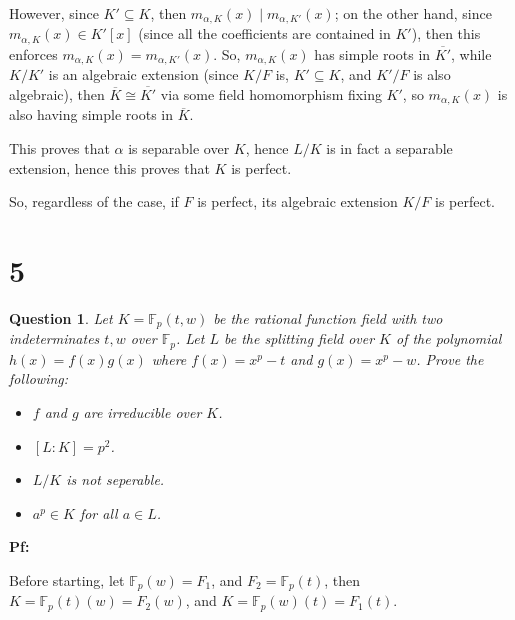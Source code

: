 \documentclass{article}
\newtheorem{question}{Question}
\begin{document}
However, since $K'\subseteq K$, then $m_{\alpha,K}(x)\mid m_{\alpha,K'}(x)$; on the other hand, since $m_{\alpha,K}(x)\in K'[x]$ (since all the coefficients are contained in $K'$), then this enforces $m_{\alpha,K}(x) = m_{\alpha,K'}(x)$. So, $m_{\alpha,K}(x)$ has simple roots in $\overline{K'}$, while $K/K'$ is an algebraic extension (since $K/F$ is, $K'\subseteq K$, and $K'/F$ is also algebraic), then $\overline{K}\cong \overline{K'}$ via some field homomorphism fixing $K'$, so $m_{\alpha,K}(x)$ is also having simple roots in $\overline{K}$.

This proves that $\alpha$ is separable over $K$, hence $L/K$ is in fact a separable extension, hence this proves that $K$ is perfect.

\hfil

So, regardless of the case, if $F$ is perfect, its algebraic extension $K/F$ is perfect.

\break

\section*{5}
\begin{myBox}[]{}
    \begin{question}
        Let $K=\mathbb{F}_p(t,w)$ be the rational function field with two indeterminates $t,w$ over $\mathbb{F}_p$. Let $L$ be the splitting field over $K$ of the polynomial $h(x)=f(x)g(x)$ where $f(x)=x^p-t$ and $g(x)=x^p-w$. Prove the following:
        \begin{itemize}
            \item[(a)] $f$ and $g$ are irreducible over $K$.
            \item[(b)] $[L:K]=p^2$.
            \item[(c)] $L/K$ is not seperable.
            \item[(d)] $a^p\in K$ for all $a\in L$.
        \end{itemize}
    \end{question}
\end{myBox}

\textbf{Pf:}

Before starting, let $\mathbb{F}_p(w) = F_1$, and $F_2 = \mathbb{F}_p(t)$, then $K=\mathbb{F}_p(t)(w) = F_2(w)$, and $K=\mathbb{F}_p(w)(t) = F_1(t)$.
\end{document}
